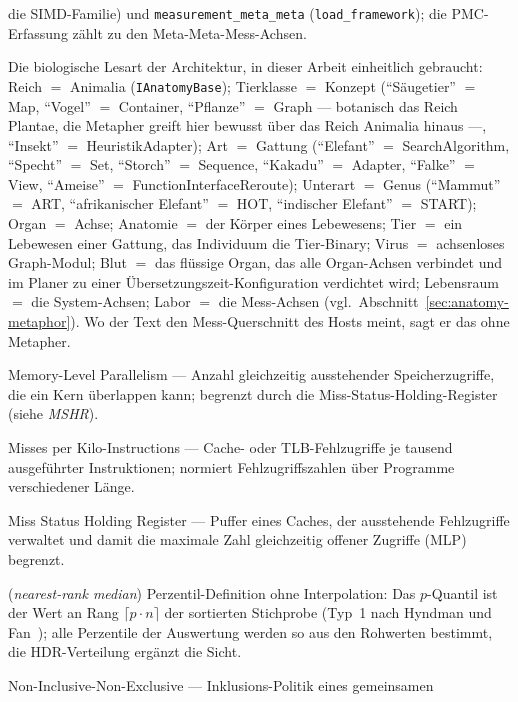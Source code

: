\begin{description}
  die SIMD-Familie) und \texttt{measurement\_meta\_meta} (\texttt{load\_framework}); die
  PMC-Erfassung zählt zu den Meta-Meta-Mess-Achsen.
  \item[Metapher-Kanon] Die biologische Lesart der Architektur, in dieser Arbeit einheitlich
  gebraucht: Reich $=$ Animalia (\texttt{IAnatomyBase}); Tierklasse $=$ Konzept (\enquote{Säugetier}
  $=$ Map, \enquote{Vogel} $=$ Container, \enquote{Pflanze} $=$ Graph --- botanisch das Reich Plantae,
  die Metapher greift hier bewusst über das Reich Animalia hinaus ---, \enquote{Insekt} $=$
  HeuristikAdapter); Art $=$ Gattung (\enquote{Elefant} $=$ SearchAlgorithm, \enquote{Specht} $=$ Set,
  \enquote{Storch} $=$ Sequence, \enquote{Kakadu} $=$ Adapter, \enquote{Falke} $=$ View,
  \enquote{Ameise} $=$ FunctionInterfaceReroute); Unterart $=$ Genus (\enquote{Mammut} $=$ ART,
  \enquote{afrikanischer Elefant} $=$ HOT, \enquote{indischer Elefant} $=$ START); Organ $=$ Achse;
  Anatomie $=$ der Körper eines Lebewesens; Tier $=$ ein Lebewesen einer Gattung, das Individuum die
  Tier-Binary; Virus $=$ achsenloses Graph-Modul; Blut $=$ das flüssige Organ, das alle
  Organ-Achsen verbindet und im Planer zu einer Übersetzungszeit-Konfiguration verdichtet wird;
  Lebensraum $=$ die System-Achsen; Labor $=$ die Mess-Achsen
  (vgl.\ Abschnitt~\ref{sec:anatomy-metaphor}). Wo der Text den Mess-Querschnitt des Hosts meint,
  sagt er das ohne Metapher.
  \item[MLP] Memory-Level Parallelism --- Anzahl gleichzeitig ausstehender Speicherzugriffe, die
  ein Kern überlappen kann; begrenzt durch die Miss-Status-Holding-Register (siehe \emph{MSHR}).
  \item[MPKI] Misses per Kilo-Instructions --- Cache- oder TLB-Fehlzugriffe je tausend
  ausgeführter Instruktionen; normiert Fehlzugriffszahlen über Programme verschiedener Länge.
  \item[MSHR] Miss Status Holding Register --- Puffer eines Caches, der ausstehende Fehlzugriffe
  verwaltet und damit die maximale Zahl gleichzeitig offener Zugriffe (MLP) begrenzt.
  \item[nearest-rank-Median] (\emph{nearest-rank median}) Perzentil-Definition ohne
  Interpolation: Das $p$-Quantil ist der Wert an Rang $\lceil p \cdot n \rceil$ der sortierten
  Stichprobe (Typ~1 nach Hyndman und Fan~\cite{hyndman1996quantiles}); alle Perzentile der
  Auswertung werden so aus den Rohwerten bestimmt, die HDR-Verteilung ergänzt die Sicht.
  \item[NINE] Non-Inclusive-Non-Exclusive --- Inklusions-Politik eines gemeinsamen

\end{description}
